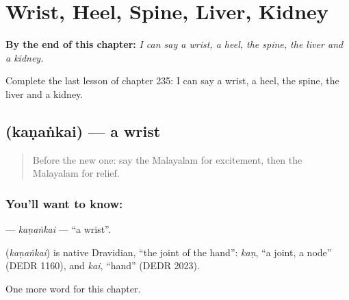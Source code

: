 
\chapter{Wrist, Heel, Spine, Liver, Kidney}
\label{ch:ml-wrist-heel-spine-liver-kidney}

\begin{chapteropening}
\textbf{By the end of this chapter:} \emph{I can say a wrist, a heel, the spine, the liver and a kidney.}

Complete the last lesson of chapter 235: I can say a wrist, a heel, the spine, the liver and a kidney.
\end{chapteropening}

\section[\texorpdfstring{\ml{കണങ്കൈ} (kaṇaṅkai)}{കണങ്കൈ (kaṇaṅkai)}]{ (kaṇaṅkai) — a wrist}

\label{lesson:ML-C235-kanankai}



\begin{quote}
Before the new one: say the Malayalam for excitement, then the Malayalam for relief.
\end{quote}

\subsection*{You'll want to know: }
\textbf{} — \emph{kaṇaṅkai} — \textquotedblleft{}a wrist\textquotedblright{}.

\begin{cousinweb}
\textbf{} (\emph{kaṇaṅkai}) is native Dravidian, \textquotedblleft{}the joint of the hand\textquotedblright{}: \emph{kaṇ}, \textquotedblleft{}a joint, a node\textquotedblright{} (DEDR 1160), and \emph{kai}, \textquotedblleft{}hand\textquotedblright{} (DEDR 2023).
\end{cousinweb}

\begin{grammarlens}[title={What you've built}]
One more word for this chapter.
\end{grammarlens}

